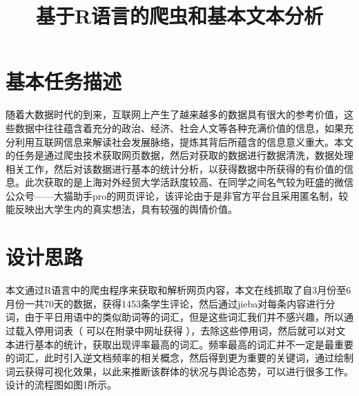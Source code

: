 \documentclass[a4paper,12pt]{ctexart}     %
\begin{document}
\songti{}
	{\heiti
	\title{基于R语言的爬虫和基本文本分析}
	\date{}
	\maketitle
	}
	

%		
%		

	\tableofcontents  %
	\newpage   %
	\section{基本任务描述}

随着大数据时代的到来，互联网上产生了越来越多的数据具有很大的参考价值，这些数据中往往蕴含着充分的政治、经济、社会人文等各种充满价值的信息，如果充分利用互联网信息来解读社会发展脉络，提炼其背后所蕴含的信息意义重大。本文的任务是通过爬虫技术获取网页数据，然后对获取的数据进行数据清洗，数据处理相关工作，然后对该数据进行基本的统计分析，以获得数据中所获得的有价值的信息。此次获取的是上海对外经贸大学活跃度较高、在同学之间名气较为旺盛的微信公众号——大猫助手pro的网页评论，该评论由于是非官方平台且采用匿名制，较能反映出大学生内的真实想法，具有较强的舆情价值。

	

	\section{设计思路}

	本文通过R语言中的爬虫程序来获取和解析网页内容，本文在线抓取了自3月份至6月份一共70天的数据，获得1453条学生评论，然后通过jieba对每条内容进行分词，由于平日用语中的类似助词等的词汇，但是这些词汇我们并不感兴趣，所以通过载入停用词表（ 可以在附录中网址获得 ），去除这些停用词，然后就可以对文本进行基本的统计，获取出现评率最高的词汇。频率最高的词汇并不一定是最重要的词汇，此时引入逆文档频率的相关概念，然后得到更为重要的关键词，通过绘制词云获得可视化效果，以此来推断该群体的状况与舆论态势，可以进行很多工作。设计的流程图如图1所示。
	
\end{document}
